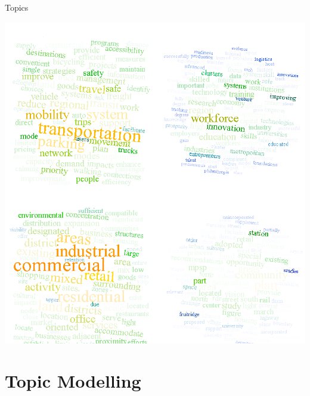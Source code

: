 \documentclass{lecture}
\begin{document}
\begin{plain}{Topics}
\vspace{-4ex}
\begin{center}
\includegraphics[scale=0.3]{figs/topic_visual}
\end{center}
\end{plain}

\section[Topic Modelling]{Topic Modelling}
\end{document}
